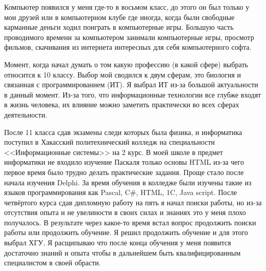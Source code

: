 Компьютер появился у меня где-то в восьмом класс, до этого он был только у мои друзей или в компьютерном клубе где иногда, когда были свободные карманные деньги ходил поиграть в компьютерные игры. Большую часть проводимого времени за компьютером занимали компьютерные игры, просмотр фильмов, скачивания из интернета интересных для себя компьютерного софта.

Момент, когда начал думать о том какую профессию (в какой сфере) выбрать относится к 10 классу. Выбор мой сводился к двум сферам, это биология и связанная с программированием (ИТ). Я выбрал ИТ из-за большой актуальности в данный момент. Из-за того, что информационные технологии все глубже входят в жизнь человека, их влияние можно заметить практически во всех сферах деятельности.

После 11 класса сдав экзамены следи которых была физика, и информатика поступил в Хакасский политехнический колледж на специальности <<Информационные системы>> на 2 курс. В моей школе в предмет информатики не входило изучение Паскаля только основы HTML из-за чего первое время было трудно делать практические задания. Проще стало после начала изучения Delphi. За время обучения в колледже были изучены такие из языков программирования как Pascal, C\#, HTML, 1C, Java script. После четвёртого курса сдав дипломную работу на пять я начал поиски работы, но из-за отсутствия опыта и не увелиности в своих силах и знаниях это у меня плохо получалось. В результате через какое-то время встал вопрос продолжить поиски работы или продолжить обучение. Я решил продолжить обучение и для этого выбрал ХГУ. Я расщипываю что после конца обучения у меня появится достаточно знаний и опыта чтобы в дальнейшем быть квалифицированным специалистом в своей обрасти.    

